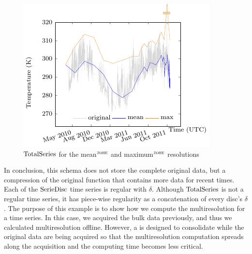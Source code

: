 \begin{figure}[tp]
  \centering
  \includegraphics{fig_exemple_4mrdtot.pdf}
  \caption{$\operatorname{TotalSeries}$ for the mean$^{\zohe}$ and maximum$^{\zohe}$
    resolutions}
  \label{fig:exemple:4mrdtot}
\end{figure}

In conclusion, this  schema does not store the complete
original data, but a compression of the original function that contains
more data for recent times.  Each of the $\operatorname{SerieDisc}$ time series is
regular with $\delta$. Although $\operatorname{TotalSeries}$ is not a regular time
series, it has piece-wise regularity as a concatenation of every
disc's $\delta$.  The purpose of this example is to show how we
compute the multiresolution for a time series. In this case, we
acquired the bulk data previously, and thus we calculated
multiresolution offline. However, a  is designed to
consolidate while the original data are being acquired so that the
multiresolution computation spreads along the acquisition and the
computing time becomes less critical.


